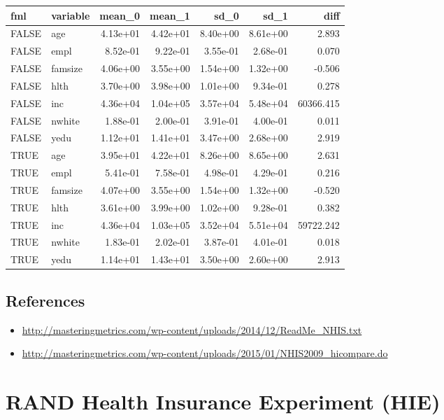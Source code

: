\documentclass[]{book}
\providecommand{\tightlist}{%
  \setlength{\itemsep}{0pt}\setlength{\parskip}{0pt}}
\theoremstyle{definition}
\theoremstyle{definition}
\theoremstyle{definition}
\theoremstyle{remark}
\begin{document}
\begin{tabular}{l|l|r|r|r|r|r}
\hline
fml & variable & mean\_0 & mean\_1 & sd\_0 & sd\_1 & diff\\
\hline
FALSE & age & 4.13e+01 & 4.42e+01 & 8.40e+00 & 8.61e+00 & 2.893\\
\hline
FALSE & empl & 8.52e-01 & 9.22e-01 & 3.55e-01 & 2.68e-01 & 0.070\\
\hline
FALSE & famsize & 4.06e+00 & 3.55e+00 & 1.54e+00 & 1.32e+00 & -0.506\\
\hline
FALSE & hlth & 3.70e+00 & 3.98e+00 & 1.01e+00 & 9.34e-01 & 0.278\\
\hline
FALSE & inc & 4.36e+04 & 1.04e+05 & 3.57e+04 & 5.48e+04 & 60366.415\\
\hline
FALSE & nwhite & 1.88e-01 & 2.00e-01 & 3.91e-01 & 4.00e-01 & 0.011\\
\hline
FALSE & yedu & 1.12e+01 & 1.41e+01 & 3.47e+00 & 2.68e+00 & 2.919\\
\hline
TRUE & age & 3.95e+01 & 4.22e+01 & 8.26e+00 & 8.65e+00 & 2.631\\
\hline
TRUE & empl & 5.41e-01 & 7.58e-01 & 4.98e-01 & 4.29e-01 & 0.216\\
\hline
TRUE & famsize & 4.07e+00 & 3.55e+00 & 1.54e+00 & 1.32e+00 & -0.520\\
\hline
TRUE & hlth & 3.61e+00 & 3.99e+00 & 1.02e+00 & 9.28e-01 & 0.382\\
\hline
TRUE & inc & 4.36e+04 & 1.03e+05 & 3.52e+04 & 5.51e+04 & 59722.242\\
\hline
TRUE & nwhite & 1.83e-01 & 2.02e-01 & 3.87e-01 & 4.01e-01 & 0.018\\
\hline
TRUE & yedu & 1.14e+01 & 1.43e+01 & 3.50e+00 & 2.60e+00 & 2.913\\
\hline
\end{tabular}

\hypertarget{references}{%
\section{References}\label{references}}

\begin{itemize}
\tightlist
\item
  \url{http://masteringmetrics.com/wp-content/uploads/2014/12/ReadMe_NHIS.txt}
\item
  \url{http://masteringmetrics.com/wp-content/uploads/2015/01/NHIS2009_hicompare.do}
\end{itemize}

\hypertarget{rand-health-insurance-experiment-hie}{%
\chapter{RAND Health Insurance Experiment
(HIE)}\label{rand-health-insurance-experiment-hie}}
\end{document}
